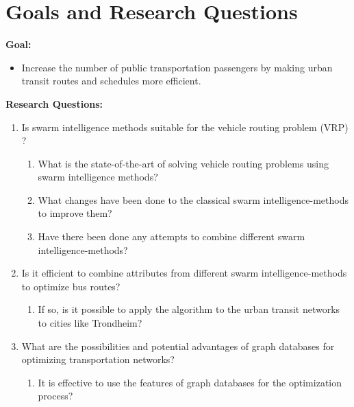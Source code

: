 \section{Goals and Research Questions}
\textbf{Goal:}
\begin{itemize}
\item \label{itm:goal} Increase the number of public transportation passengers by making urban transit routes and schedules more efficient.
\end{itemize}
\textbf{Research Questions:}
\begin{enumerate}
  \item Is swarm intelligence methods suitable for the vehicle routing problem (VRP) ?
    \begin{enumerate}
    \item What is the state-of-the-art of solving vehicle routing problems using swarm intelligence methods?
    \item What changes have been done to the classical swarm intelligence-methods to improve them?
    \item Have there been done any attempts to combine different swarm intelligence-methods?
  \end{enumerate}
 
\item Is it efficient to combine attributes from different swarm intelligence-methods to optimize bus routes?
    \begin{enumerate}
    \item If so, is it possible to apply the algorithm to the urban transit networks to cities like Trondheim?
  \end{enumerate}
\item What are the possibilities and potential advantages of graph databases for optimizing transportation networks?
\begin{enumerate}
\item It is effective to use the features of graph databases for the optimization process? 
\end{enumerate}
\end{enumerate}